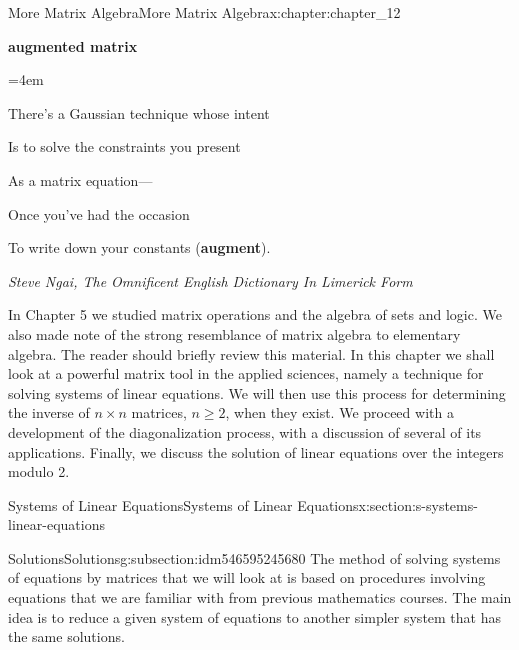 \documentclass[oneside,10pt,]{book}
\newcommand{\terminology}[1]{\textbf{#1}}
\numberwithin{equation}{section}
\newenvironment{poem}{\setlength{\parindent}{0em}}{}
\newcommand{\poemTitle}[1]{\begin{center}\large\textbf{#1}\end{center}}
\newenvironment{stanza}{\vspace{0.25 em}\hangindent=4em}{\vspace{1 em}}
\newcommand{\poemauthorleft}[1]{\vspace{-1em}\begin{flushleft}\textit{#1}\end{flushleft}}
\newcommand{\poemlineleft}[1]{{\raggedright{#1}\par}\vspace{-\parskip}}
\begin{document}
\begin{chapterptx}{More Matrix Algebra}{}{More Matrix Algebra}{}{}{x:chapter:chapter_12}
\begin{introduction}{}%
\begin{poem}%
\poemTitle{augmented matrix}
\begin{stanza}
\poemlineleft{There's a Gaussian technique whose intent}
\poemlineleft{Is to solve the constraints you present}
\poemlineleft{As a matrix equation—}
\poemlineleft{Once you've had the occasion}
\poemlineleft{To write down your constants (\terminology{augment}).}
\end{stanza}
\poemauthorleft{Steve Ngai, The Omnificent English Dictionary In Limerick Form}
\end{poem}
In Chapter 5 we studied matrix operations and the algebra of sets and logic. We also made note of the strong resemblance of matrix algebra to elementary algebra. The reader should briefly review this material. In this chapter we shall look at a powerful matrix tool in the applied sciences, namely a technique for solving systems of linear equations. We will then use this process for determining the inverse of \(n\times n\) matrices, \(n \geq 2\), when they exist. We proceed with a development of the diagonalization process, with a discussion of several of its applications. Finally, we discuss the solution of linear equations over the integers modulo 2.%
\end{introduction}%
%
%
\typeout{************************************************}
\typeout{************************************************}
%
\begin{sectionptx}{Systems of Linear Equations}{}{Systems of Linear Equations}{}{}{x:section:s-systems-linear-equations}
%
%
%
\typeout{************************************************}
\typeout{************************************************}
%
\begin{subsectionptx}{Solutions}{}{Solutions}{}{}{g:subsection:idm546595245680}
The method of solving systems of equations by matrices that we will look at is based on procedures involving equations that we are familiar with from previous mathematics courses. The main idea is to reduce a given system of equations to another simpler system that has the same solutions.%
\end{subsectionptx}
\end{sectionptx}
\end{chapterptx}
\end{document}
